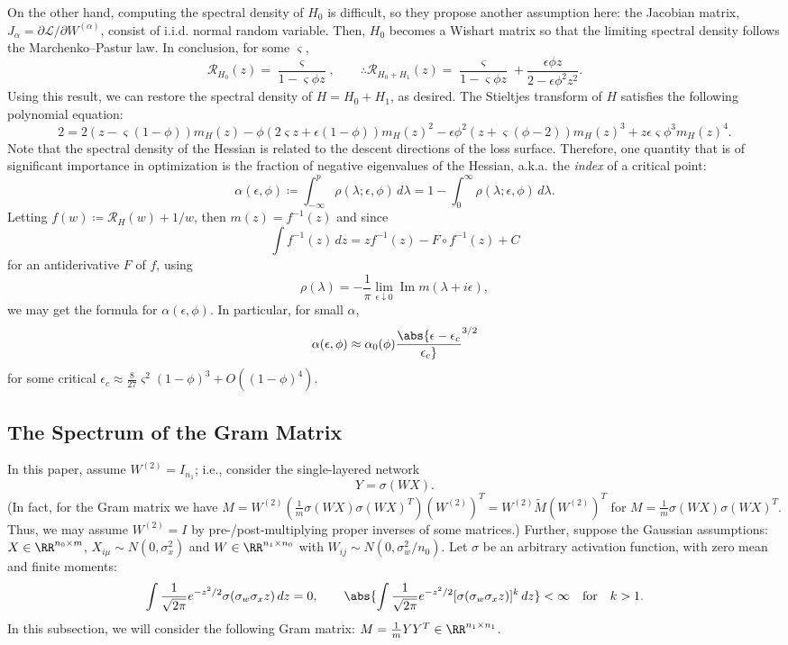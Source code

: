 \documentclass[notitlepage]{report}
\begin{document}
On the other hand, computing the spectral density of $H_0$ is difficult, so they propose another assumption here: the Jacobian matrix, $J_\alpha = \partial \mathcal L / \partial W^{(\alpha)}$, consist of i.i.d. normal random variable. Then, $H_0$ becomes a Wishart matrix so that the limiting spectral density follows the Marchenko--Pastur law. In conclusion, for some $\varsigma$,
\[ \mathcal R_{H_0}(z) = \frac{\varsigma}{1-\varsigma\phi z},\qquad \therefore \mathcal R_{H_0+H_1}(z) = \frac{\varsigma}{1-\varsigma\phi z} + \frac{\epsilon\phi z}{2-\epsilon\phi^2 z^2}. \]
Using this result, we can restore the spectral density of $H=H_0 + H_1$, as desired. The Stieltjes transform of $H$ satisfies the following polynomial equation:
\[ 2 = 2(z - \varsigma (1-\phi ))m_H(z) - \phi(2\varsigma z + \epsilon(1-\phi))m_H(z)^2 - \epsilon \phi^2 (z + \varsigma(\phi - 2))m_H(z)^3 + z\epsilon \varsigma \phi^3 m_H(z)^4. \]
Note that the spectral density of the Hessian is related to the descent directions of the loss surface. Therefore, one quantity that is of significant importance in optimization is the fraction of negative eigenvalues of the Hessian, a.k.a. the \emph{index} of a critical point:
\[ \alpha(\epsilon,\phi) \coloneqq \int_{-\infty}^p \rho(\lambda;\epsilon,\phi)\,d\lambda = 1 - \int_0^\infty \rho(\lambda;\epsilon,\phi)\,d\lambda. \]
Letting $f(w) \coloneqq \mathcal R_H(w) + 1/w$, then $m(z) = f^{-1}(z)$ and since
\[ \int f^{-1}(z)\,dz = zf^{-1}(z) - F\circ f^{-1}(z) +C \]
for an antiderivative $F$ of $f$, using
\[ \rho(\lambda) = -\frac 1\pi \lim_{\epsilon\downarrow 0} \operatorname{Im} m(\lambda+i\epsilon), \]
we may get the formula for $\alpha(\epsilon,\phi)$. In particular, for small $\alpha$,
\[ \alpha(\epsilon,\phi)\approx \alpha_0(\phi) \abs{\epsilon - \epsilon_c \over \epsilon_c}^{3/2} \]
for some critical $\epsilon_c \approx \frac 8 {27}\varsigma^2 (1-\phi)^3 + O((1-\phi)^4)$.

\subsection{The Spectrum of the Gram Matrix \cite{pennington-worah1}}

In this paper, assume $W^{(2)} = I_{n_1}$; i.e., consider the single-layered network
\[ Y = \sigma(W X). \]
(In fact, for the Gram matrix we have $M = W^{(2)} (\frac1m \sigma(WX)\sigma(WX)^T)(W^{(2)})^T = W^{(2)}\tilde M (W^{(2)})^T$ for $M = \frac 1m \sigma(WX)\sigma(WX)^T$. Thus, we may assume $W^{(2)} = I$ by pre-/post-multiplying proper inverses of some matrices.) Further, suppose the Gaussian assumptions: $X\in\RR^{n_0\times m}$, $X_{i\mu} \sim N(0,\sigma_x^2)$ and $W\in \RR^{n_1\times n_0}$ with $W_{ij}\sim N(0,\sigma_w^2/n_0)$. Let $\sigma$ be an arbitrary activation function, with zero mean and finite moments:
\[ \int \frac{1}{\sqrt{2\pi}} e^{-z^2/2} \sigma(\sigma_w\sigma_x z) \,dz = 0,\qquad \abs{\int \frac{1}{\sqrt{2\pi}} e^{-z^2/2} [\sigma(\sigma_w\sigma_x z)]^k \,dz }<\infty\quad\text{for}\quad k>1. \]
In this subsection, we will consider the following Gram matrix: $M = \frac 1m Y Y^T \in \RR^{n_1\times n_1}$.
\end{document}
